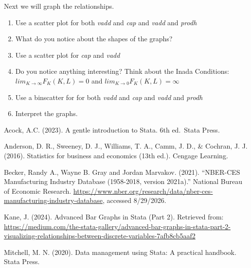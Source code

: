 \documentclass[
]{book}
\providecommand{\tightlist}{%
  \setlength{\itemsep}{0pt}\setlength{\parskip}{0pt}}
\begin{document}
Next we will graph the relationships.

\begin{enumerate}
\def\labelenumi{\arabic{enumi}.}
\tightlist
\item
  Use a scatter plot for both \emph{vadd} and \emph{cap} and \emph{vadd} and \emph{prodh}
\item
  What do you notice about the shapes of the graphs?
\item
  Use a scatter plot for \emph{cap} and \emph{vadd}
\item
  Do you notice anything interesting? Think about the Inada Conditions: \(lim_{K\rightarrow \infty}F_K(K,L)=0\) and \(lim_{K\rightarrow 0}F_K(K,L)=\infty\)
\item
  Use a binscatter for for both \emph{vadd} and \emph{cap} and \emph{vadd} and \emph{prodh}
\item
  Interpret the graphs.
\end{enumerate}

Acock, A.C. (2023). A gentle introduction to Stata. 6th ed.~Stata Press.

Anderson, D. R., Sweeney, D. J., Williams, T. A., Camm, J. D., \& Cochran, J. J. (2016). Statistics for business and economics (13th ed.). Cengage Learning.

Becker, Randy A., Wayne B. Gray and Jordan Marvakov. (2021). ``NBER-CES Manufacturing Industry Database (1958-2018, version 2021a).'' National Bureau of Economic Research. \url{https://www.nber.org/research/data/nber-ces-manufacturing-industry-database}, accessed 8/29/2026.

Kane, J. (2024). Advanced Bar Graphs in Stata (Part 2). Retrieved from:
\url{https://medium.com/the-stata-gallery/advanced-bar-graphs-in-stata-part-2-visualizing-relationships-between-discrete-variables-7afb8cb5aaf2}

Mitchell, M. N. (2020). Data management using Stata: A practical handbook. Stata Press.


\end{document}
